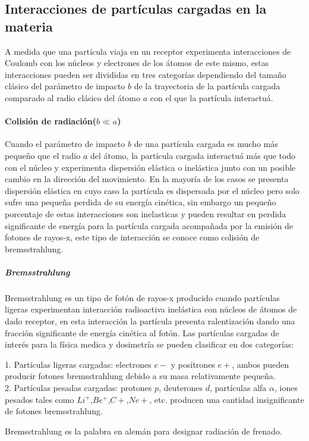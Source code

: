 \subsection{Interacciones de partículas cargadas en la materia}
A medida que una partícula viaja en un receptor experimenta interacciones de Coulomb con los núcleos y electrones de los átomos de este mismo, estas interacciones pueden ser divididas en tres categorías dependiendo del tamaño clásico del parámetro de impacto $b$ de la trayectoria de la partícula cargada comparado al radio clásico del átomo $a$ con el que la partícula interactuá.
\paragraph{Colisión de radiación($b\ll a$)}
Cuando el parámetro de impacto $b$ de una partícula cargada es mucho más pequeño que el radio $a$ del átomo, la partícula cargada interactuá más que todo con el núcleo y experimenta dispersión elástica o inelástica junto con un posible cambio en la dirección del movimiento. En la mayoría de los casos se presenta dispersión elástica en cuyo caso la partícula es dispersada por el núcleo pero solo sufre una pequeña perdida de su energía cinética, sin embargo un pequeño porcentaje de estas interacciones son inelasticas y pueden resultar en perdida significante de energía para la partícula cargada acompañada por la emisión de fotones de rayos-x, este tipo de interacción se conoce como colisión de bremsstrahlung\cite{Podgorsak}.


\subparagraph{Bremsstrahlung}
Bremsstrahlung es un tipo de fotón de rayos-x producido cuando partículas ligeras experimentan interacción radioactiva inelástica con núcleos de átomos de dado receptor, en esta interacción la partícula presenta ralentización
 dando una fracción significante de energía cinética al fotón\cite{Frank}. Las partículas cargadas de interés para la física medica y dosimetría se pueden clasificar en dos categorías:

1. Partículas ligeras cargadas: electrones $e-$ y positrones $e+$, ambos pueden producir fotones bremsstrahlung debido a su masa relativamente pequeña\cite{Podgorsak}.\\
2. Partículas pesadas cargadas: protones $p$, deuterones $d$, partículas alfa $\alpha$, iones pesados tales como $Li^+$,$Be^+$,$C+$,$Ne+$, etc. producen una cantidad insignificante de fotones bremsstrahlung\cite{Podgorsak}.

Bremsstrahlung es la palabra en alemán para designar radiación de frenado.

